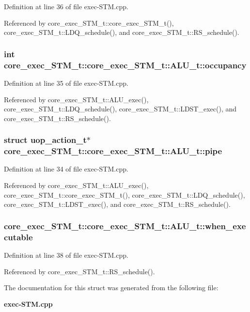 Definition at line 36 of file exec-STM.cpp.

Referenced by core\_\-exec\_\-STM\_\-t::core\_\-exec\_\-STM\_\-t(), core\_\-exec\_\-STM\_\-t::LDQ\_\-schedule(), and core\_\-exec\_\-STM\_\-t::RS\_\-schedule().
\subsubsection[{occupancy}]{\setlength{\rightskip}{0pt plus 5cm}int core\_\-exec\_\-STM\_\-t::core\_\-exec\_\-STM\_\-t::ALU\_\-t::occupancy}\label{structcore__exec__STM__t_1_1ALU__t_697bd69a9f05f19bc81e13444ad4b9a3}




Definition at line 35 of file exec-STM.cpp.

Referenced by core\_\-exec\_\-STM\_\-t::ALU\_\-exec(), core\_\-exec\_\-STM\_\-t::LDQ\_\-schedule(), core\_\-exec\_\-STM\_\-t::LDST\_\-exec(), and core\_\-exec\_\-STM\_\-t::RS\_\-schedule().
\subsubsection[{pipe}]{\setlength{\rightskip}{0pt plus 5cm}struct {\bf uop\_\-action\_\-t}$\ast$ core\_\-exec\_\-STM\_\-t::core\_\-exec\_\-STM\_\-t::ALU\_\-t::pipe\hspace{0.3cm}{\tt  [read]}}\label{structcore__exec__STM__t_1_1ALU__t_a1ccbae90059fb44173346a2e84fa3c8}




Definition at line 34 of file exec-STM.cpp.

Referenced by core\_\-exec\_\-STM\_\-t::ALU\_\-exec(), core\_\-exec\_\-STM\_\-t::core\_\-exec\_\-STM\_\-t(), core\_\-exec\_\-STM\_\-t::LDQ\_\-schedule(), core\_\-exec\_\-STM\_\-t::LDST\_\-exec(), and core\_\-exec\_\-STM\_\-t::RS\_\-schedule().
\subsubsection[{when\_\-executable}]{ core\_\-exec\_\-STM\_\-t::core\_\-exec\_\-STM\_\-t::ALU\_\-t::when\_\-executable}\label{structcore__exec__STM__t_1_1ALU__t_f32b8d4e21f38909440e84f74423218b}




Definition at line 38 of file exec-STM.cpp.

Referenced by core\_\-exec\_\-STM\_\-t::RS\_\-schedule().

The documentation for this struct was generated from the following file:\begin{CompactItemize}
\item 
{\bf exec-STM.cpp}\end{CompactItemize}
